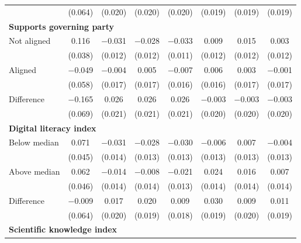\begin{tabular}[t]{lccccccc}
 & (\num{0.064}) & (\num{0.020}) & (\num{0.020}) & (\num{0.020}) & (\num{0.019}) & (\num{0.019}) & (\num{0.019})\\\multicolumn{4}{l}{\textbf{Supports governing party}} \rule{0pt}{1.2\normalbaselineskip}\\
\hspace{1em} Not aligned & \num{0.116} & \num{-0.031} & \num{-0.028} & \num{-0.033} & \num{0.009} & \num{0.015} & \num{0.003}\\
 & (\num{0.038}) & (\num{0.012}) & (\num{0.012}) & (\num{0.011}) & (\num{0.012}) & (\num{0.012}) & (\num{0.012})\\
\hspace{1em} Aligned & \num{-0.049} & \num{-0.004} & \num{0.005} & \num{-0.007} & \num{0.006} & \num{0.003} & \num{-0.001}\\
 & (\num{0.058}) & (\num{0.017}) & (\num{0.017}) & (\num{0.016}) & (\num{0.016}) & (\num{0.017}) & (\num{0.017})\\\cmidrule(lr){2-8}
\hspace{1em} Difference & \num{-0.165} & \num{0.026} & \num{0.026} & \num{0.026} & \num{-0.003} & \num{-0.003} & \num{-0.003}\\
 & (\num{0.069}) & (\num{0.021}) & (\num{0.021}) & (\num{0.021}) & (\num{0.020}) & (\num{0.020}) & (\num{0.020})\\\multicolumn{4}{l}{\textbf{Digital literacy index}} \rule{0pt}{1.2\normalbaselineskip}\\
\hspace{1em} Below median & \num{0.071} & \num{-0.031} & \num{-0.028} & \num{-0.030} & \num{-0.006} & \num{0.007} & \num{-0.004}\\
 & (\num{0.045}) & (\num{0.014}) & (\num{0.013}) & (\num{0.013}) & (\num{0.013}) & (\num{0.013}) & (\num{0.013})\\
\hspace{1em} Above median & \num{0.062} & \num{-0.014} & \num{-0.008} & \num{-0.021} & \num{0.024} & \num{0.016} & \num{0.007}\\
 & (\num{0.046}) & (\num{0.014}) & (\num{0.014}) & (\num{0.013}) & (\num{0.014}) & (\num{0.014}) & (\num{0.014})\\\cmidrule(lr){2-8}
\hspace{1em}  Difference & \num{-0.009} & \num{0.017} & \num{0.020} & \num{0.009} & \num{0.030} & \num{0.009} & \num{0.011}\\
 & (\num{0.064}) & (\num{0.020}) & (\num{0.019}) & (\num{0.018}) & (\num{0.019}) & (\num{0.020}) & (\num{0.019})\\\multicolumn{4}{l}{\textbf{Scientific knowledge index}} \rule{0pt}{1.2\normalbaselineskip}\\

\end{tabular}
